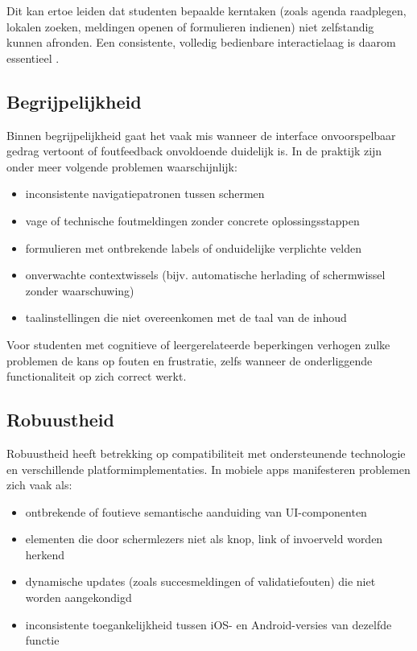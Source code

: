 Dit kan ertoe leiden dat studenten bepaalde kerntaken (zoals agenda raadplegen, lokalen zoeken, meldingen openen of formulieren indienen) niet zelfstandig kunnen afronden. Een consistente, volledig bedienbare interactielaag is daarom essentieel \autocite{W3CWCAG21}.

\subsection{Begrijpelijkheid}
\label{subsec:problemen-begrijpelijkheid}

Binnen begrijpelijkheid gaat het vaak mis wanneer de interface onvoorspelbaar gedrag vertoont of foutfeedback onvoldoende duidelijk is. In de praktijk zijn onder meer volgende problemen waarschijnlijk:

\begin{itemize}
    \item inconsistente navigatiepatronen tussen schermen
    \item vage of technische foutmeldingen zonder concrete oplossingsstappen
    \item formulieren met ontbrekende labels of onduidelijke verplichte velden
    \item onverwachte contextwissels (bijv. automatische herlading of schermwissel zonder waarschuwing)
    \item taalinstellingen die niet overeenkomen met de taal van de inhoud
\end{itemize}

Voor studenten met cognitieve of leergerelateerde beperkingen verhogen zulke problemen de kans op fouten en frustratie, zelfs wanneer de onderliggende functionaliteit op zich correct werkt.

\subsection{Robuustheid}
\label{subsec:problemen-robuustheid}

Robuustheid heeft betrekking op compatibiliteit met ondersteunende technologie en verschillende platformimplementaties. In mobiele apps manifesteren problemen zich vaak als:

\begin{itemize}
    \item ontbrekende of foutieve semantische aanduiding van UI-componenten
    \item elementen die door schermlezers niet als knop, link of invoerveld worden herkend
    \item dynamische updates (zoals succesmeldingen of validatiefouten) die niet worden aangekondigd
    \item inconsistente toegankelijkheid tussen iOS- en Android-versies van dezelfde functie
\end{itemize}

